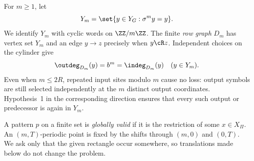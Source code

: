 For $m\geq1$, let
\[
 Y_m=\set{y\in Y_G:\sigma^m y=y}.
\]
We identify $Y_m$ with cyclic words on $\ZZ/m\ZZ$.  The finite \emph{row graph} $D_m$ has vertex set $Y_m$ and an edge $y\to z$ precisely when $y\cR z$.  Independent choices on the cylinder give
\begin{equation}\label{eq:row-degrees}
 \outdeg_{D_m}(y)=b^m=\indeg_{D_m}(y)
 \quad(y\in Y_m).
\end{equation}
Even when $m\leq2R$, repeated input sites modulo $m$ cause no loss: output symbols are still selected independently at the $m$ distinct output coordinates.  Hypothesis~1 in the corresponding direction ensures that every such output or predecessor is again in $Y_m$.

A pattern $p$ on a finite set is \emph{globally valid} if it is the restriction of some $x\in X_\Pi$.  An $(m,T)$-periodic point is fixed by the shifts through $(m,0)$ and $(0,T)$.  We ask only that the given rectangle occur somewhere, so translations made below do not change the problem.
